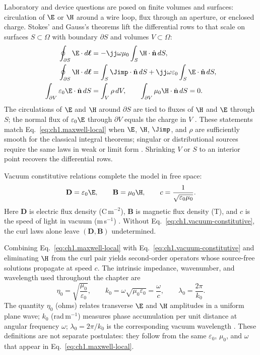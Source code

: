 Laboratory and device questions are posed on finite volumes and surfaces: circulation of $\E$ or $\H$ around a wire loop, flux through an aperture, or enclosed charge. Stokes' and Gauss's theorems lift the differential rows to that scale on surfaces $S\subset\Omega$ with boundary $\partial S$ and volumes $V\subset\Omega$:
\begin{equation}
\label{eq:ch1.maxwell-integral}
\begin{aligned}
\oint_{\partial S}\E\cdot d\boldsymbol{\ell}
&=-\jj\omega\mu_0\int_S\H\cdot\hat{\mathbf{n}}\,dS,\\
\oint_{\partial S}\H\cdot d\boldsymbol{\ell}
&=\int_S\Jimp\cdot\hat{\mathbf{n}}\,dS
+\jj\omega\varepsilon_0\int_S\E\cdot\hat{\mathbf{n}}\,dS,\\
\int_{\partial V}\varepsilon_0\E\cdot\hat{\mathbf{n}}\,dS
&=\int_V\rho\,dV,\qquad
\int_{\partial V}\mu_0\H\cdot\hat{\mathbf{n}}\,dS=0.
\end{aligned}
\end{equation}
The circulations of $\E$ and $\H$ around $\partial S$ are tied to fluxes of $\H$ and $\E$ through $S$; the normal flux of $\varepsilon_0\E$ through $\partial V$ equals the charge in $V$ \cite{stratton1941}. These statements match Eq.~\eqref{eq:ch1.maxwell-local} when $\E$, $\H$, $\Jimp$, and $\rho$ are sufficiently smooth for the classical integral theorems; singular or distributional sources require the same laws in weak or limit form \cite{stratton1941}. \label{prop:ch1.local-integral-equivalence}
Shrinking $V$ or $S$ to an interior point recovers the differential rows.

Vacuum constitutive relations complete the model in free space:
\begin{equation}
\label{eq:ch1.vacuum-constitutive}
\mathbf{D}=\varepsilon_0\E,\qquad
\mathbf{B}=\mu_0\H,\qquad
c=\frac{1}{\sqrt{\varepsilon_0\mu_0}}.
\end{equation}
Here $\mathbf{D}$ is electric flux density (C\,m$^{-2}$), $\mathbf{B}$ is magnetic flux density (T), and $c$ is the speed of light in vacuum (m\,s$^{-1}$) \cite{stratton1941}. Without Eq.~\eqref{eq:ch1.vacuum-constitutive}, the curl laws alone leave $(\mathbf{D},\mathbf{B})$ undetermined.

Combining Eq.~\eqref{eq:ch1.maxwell-local} with Eq.~\eqref{eq:ch1.vacuum-constitutive} and eliminating $\H$ from the curl pair yields second-order operators whose source-free solutions propagate at speed $c$. The intrinsic impedance, wavenumber, and wavelength used throughout the chapter are
\begin{equation}
\label{eq:ch1.vacuum-impedance-wavenumber}
\eta_0=\sqrt{\frac{\mu_0}{\varepsilon_0}},\qquad
k_0=\omega\sqrt{\mu_0\varepsilon_0}=\frac{\omega}{c},\qquad
\lambda_0=\frac{2\pi}{k_0}.
\end{equation}
The quantity $\eta_0$ (ohms) relates transverse $\E$ and $\H$ amplitudes in a uniform plane wave; $k_0$ (rad\,m$^{-1}$) measures phase accumulation per unit distance at angular frequency $\omega$; $\lambda_0=2\pi/k_0$ is the corresponding vacuum wavelength \cite{stratton1941}. These definitions are not separate postulates: they follow from the same $\varepsilon_0$, $\mu_0$, and $\omega$ that appear in Eq.~\eqref{eq:ch1.maxwell-local}.


